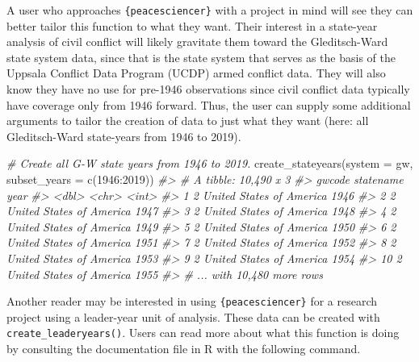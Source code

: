 \documentclass[
  11pt,
]{article}
\newenvironment{Shaded}{\begin{snugshade}}{\end{snugshade}}
\newcommand{\AttributeTok}[1]{\textcolor[rgb]{0.77,0.63,0.00}{#1}}
\newcommand{\CommentTok}[1]{\textcolor[rgb]{0.56,0.35,0.01}{\textit{#1}}}
\newcommand{\DecValTok}[1]{\textcolor[rgb]{0.00,0.00,0.81}{#1}}
\newcommand{\FunctionTok}[1]{\textcolor[rgb]{0.00,0.00,0.00}{#1}}
\newcommand{\NormalTok}[1]{#1}
\newcommand{\SpecialCharTok}[1]{\textcolor[rgb]{0.00,0.00,0.00}{#1}}
\newcommand{\StringTok}[1]{\textcolor[rgb]{0.31,0.60,0.02}{#1}}
\begin{document}
A user who approaches \texttt{\{peacesciencer\}} with a project in mind will see they can better tailor this function to what they want. Their interest in a state-year analysis of civil conflict will likely gravitate them toward the Gleditsch-Ward state system data, since that is the state system that serves as the basis of the Uppsala Conflict Data Program (UCDP) armed conflict data. They will also know they have no use for pre-1946 observations since civil conflict data typically have coverage only from 1946 forward. Thus, the user can supply some additional arguments to tailor the creation of data to just what they want (here: all Gleditsch-Ward state-years from 1946 to 2019).

\begin{Shaded}
\begin{Highlighting}[]
\CommentTok{\# Create all G{-}W state years from 1946 to 2019.}
\FunctionTok{create\_stateyears}\NormalTok{(}\AttributeTok{system =} \StringTok{\textquotesingle{}gw\textquotesingle{}}\NormalTok{, }\AttributeTok{subset\_years =} \FunctionTok{c}\NormalTok{(}\DecValTok{1946}\SpecialCharTok{:}\DecValTok{2019}\NormalTok{))}
\CommentTok{\#\textgreater{} \# A tibble: 10,490 x 3}
\CommentTok{\#\textgreater{}    gwcode statename                 year}
\CommentTok{\#\textgreater{}     \textless{}dbl\textgreater{} \textless{}chr\textgreater{}                    \textless{}int\textgreater{}}
\CommentTok{\#\textgreater{}  1      2 United States of America  1946}
\CommentTok{\#\textgreater{}  2      2 United States of America  1947}
\CommentTok{\#\textgreater{}  3      2 United States of America  1948}
\CommentTok{\#\textgreater{}  4      2 United States of America  1949}
\CommentTok{\#\textgreater{}  5      2 United States of America  1950}
\CommentTok{\#\textgreater{}  6      2 United States of America  1951}
\CommentTok{\#\textgreater{}  7      2 United States of America  1952}
\CommentTok{\#\textgreater{}  8      2 United States of America  1953}
\CommentTok{\#\textgreater{}  9      2 United States of America  1954}
\CommentTok{\#\textgreater{} 10      2 United States of America  1955}
\CommentTok{\#\textgreater{} \# ... with 10,480 more rows}
\end{Highlighting}
\end{Shaded}

Another reader may be interested in using \texttt{\{peacesciencer\}} for a research project using a leader-year unit of analysis. These data can be created with \texttt{create\_leaderyears()}. Users can read more about what this function is doing by consulting the documentation file in R with the following command.
\end{document}
